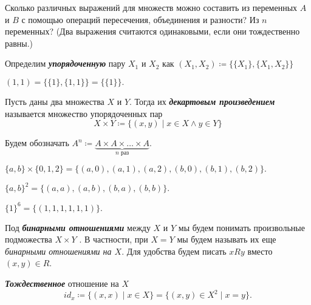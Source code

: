 \documentclass{article}
\begin{document}
    \begin{task_boxed}[*]
        Сколько различных выражений для множеств можно составить из переменных $A$  и $B$ с помощью операций пересечения, объединения и разности?
        Из $n$ переменных?
        (Два выражения считаются одинаковыми, если они тождественно равны.)
    \end{task_boxed}


    \begin{definition_boxed}
        Определим \textit{\textbf{упорядоченную}} пару $X_1$ и $X_2$ как $(X_1, X_2) \coloneqq \{\{X_1\} , \{X_1, X_2\}\}$
    \end{definition_boxed}

    \begin{example}
        $(1,1) = \{\{1\}, \{1,1\}\} = \{\{1\}\}.$
    \end{example}

    \begin{definition_boxed}
        Пусть даны два множества $X$ и $Y$.
        Тогда их \textbf{\textit{декартовым произведением}} называется множество упорядоченных пар
        \[X\times Y \coloneqq \{(x,y) \mid x\in X \wedge y\in Y\}\]

        Будем обозначать $A^n \coloneqq \underbrace{A\times A \times \dotsc \times A}_{n \text{ раз}}.$
    \end{definition_boxed}

    \begin{example}
        $\{a,b\}\times \{0,1,2\} = \{(a,0),(a,1),(a,2),(b,0),(b,1),(b,2)\}.$
    \end{example}

    \begin{example}
        $\{a,b\}^2 = \{(a,a),(a,b),(b,a),(b,b)\}.$
    \end{example}

    \begin{example}
        $\{1\}^6 = \{(1,1,1,1,1,1)\}.$
    \end{example}

    \begin{definition_boxed}
        Под \textit{\textbf{бинарными отношениями}} между $X$ и $Y$ мы будем понимать произвольные подможества $X \times Y$ .
        В частности, при $X = Y$ мы будем называть их еще \textit{бинарными отношениями на $X$}.
        Для удобства будем писать $xRy$ вместо $(x, y) \in R$.
    \end{definition_boxed}

    \begin{example}
        \textbf{\textit{Тождественное}} отношение на $X$ \[id_x \coloneqq \{(x,x) \mid x\in X\}= \{(x,y)\in  X^2 \mid x=y\}.\]
    \end{example}
\end{document}
